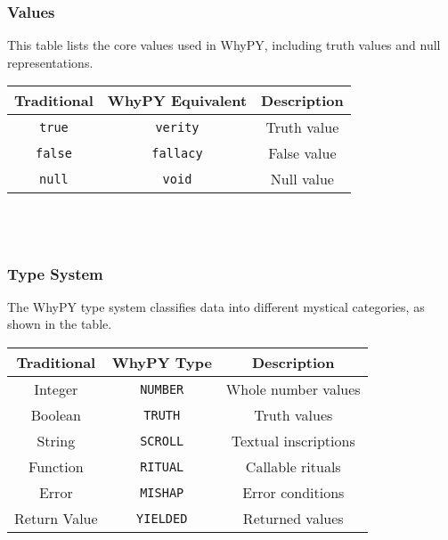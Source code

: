 \documentclass[conference]{IEEEtran}
\begin{document}
\subsubsection{Values}
This table lists the core values used in WhyPY, including truth values and null representations. \\ 
\par \vspace{1mm} 
\begin{tabular}{|c|c|c|}
\hline
\textbf{Traditional} & \textbf{WhyPY Equivalent} & \textbf{Description} \\
\hline
\texttt{true} & \texttt{verity} & Truth value \\
\texttt{false} & \texttt{fallacy} & False value \\
\texttt{null} & \texttt{void} & Null value \\
\hline
\end{tabular}
\\
\\

\subsubsection{Type System}
The WhyPY type system classifies data into different mystical categories, as shown in the table. \\
\par \vspace{1sp} 
\begin{tabular}{|c|c|c|}
\hline
\textbf{Traditional} & \textbf{WhyPY Type} & \textbf{Description} \\
\hline
Integer & \texttt{NUMBER} & Whole number values \\
Boolean & \texttt{TRUTH} & Truth values \\
String & \texttt{SCROLL} & Textual inscriptions \\
Function & \texttt{RITUAL} & Callable rituals \\
Error & \texttt{MISHAP} & Error conditions \\
Return Value & \texttt{YIELDED} & Returned values \\
\hline
\end{tabular}
\\ 
\\
\end{document}
